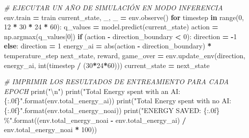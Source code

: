\documentclass[
]{book}
\newenvironment{Shaded}{\begin{snugshade}}{\end{snugshade}}
\newcommand{\BuiltInTok}[1]{#1}
\newcommand{\CharTok}[1]{\textcolor[rgb]{0.31,0.60,0.02}{#1}}
\newcommand{\CommentTok}[1]{\textcolor[rgb]{0.56,0.35,0.01}{\textit{#1}}}
\newcommand{\ControlFlowTok}[1]{\textcolor[rgb]{0.13,0.29,0.53}{\textbf{#1}}}
\newcommand{\DecValTok}[1]{\textcolor[rgb]{0.00,0.00,0.81}{#1}}
\newcommand{\KeywordTok}[1]{\textcolor[rgb]{0.13,0.29,0.53}{\textbf{#1}}}
\newcommand{\NormalTok}[1]{#1}
\newcommand{\OperatorTok}[1]{\textcolor[rgb]{0.81,0.36,0.00}{\textbf{#1}}}
\newcommand{\SpecialCharTok}[1]{\textcolor[rgb]{0.00,0.00,0.00}{#1}}
\newcommand{\StringTok}[1]{\textcolor[rgb]{0.31,0.60,0.02}{#1}}
\begin{document}
\begin{Shaded}
\begin{Highlighting}[]
\CommentTok{\# EJECUTAR UN AÑO DE SIMULACIÓN EN MODO INFERENCIA}
\NormalTok{env.train }\OperatorTok{=}\NormalTok{ train}
\NormalTok{current\_state, \_, \_ }\OperatorTok{=}\NormalTok{ env.observe()}
\ControlFlowTok{for}\NormalTok{ timestep }\KeywordTok{in} \BuiltInTok{range}\NormalTok{(}\DecValTok{0}\NormalTok{, }\DecValTok{12} \OperatorTok{*} \DecValTok{30} \OperatorTok{*} \DecValTok{24} \OperatorTok{*} \DecValTok{60}\NormalTok{):}
\NormalTok{    q\_values }\OperatorTok{=}\NormalTok{ model.predict(current\_state)}
\NormalTok{    action }\OperatorTok{=}\NormalTok{ np.argmax(q\_values[}\DecValTok{0}\NormalTok{])}
    \ControlFlowTok{if}\NormalTok{ (action }\OperatorTok{{-}}\NormalTok{ direction\_boundary }\OperatorTok{\textless{}} \DecValTok{0}\NormalTok{):}
\NormalTok{        direction }\OperatorTok{=} \OperatorTok{{-}}\DecValTok{1}
    \ControlFlowTok{else}\NormalTok{:}
\NormalTok{        direction }\OperatorTok{=} \DecValTok{1}
\NormalTok{    energy\_ai }\OperatorTok{=} \BuiltInTok{abs}\NormalTok{(action }\OperatorTok{{-}}\NormalTok{ direction\_boundary) }\OperatorTok{*}\NormalTok{ temperature\_step}
\NormalTok{    next\_state, reward, game\_over }\OperatorTok{=}\NormalTok{ env.update\_env(direction,}
\NormalTok{                                                   energy\_ai,}
                                                   \BuiltInTok{int}\NormalTok{(timestep }\OperatorTok{/}\NormalTok{ (}\DecValTok{30}\OperatorTok{*}\DecValTok{24}\OperatorTok{*}\DecValTok{60}\NormalTok{)))}
\NormalTok{    current\_state }\OperatorTok{=}\NormalTok{ next\_state}

\CommentTok{\# IMPRIMIR LOS RESULTADOS DE ENTREAMIENTO PARA CADA EPOCH}
\BuiltInTok{print}\NormalTok{(}\StringTok{"}\CharTok{\textbackslash{}n}\StringTok{"}\NormalTok{)}
\BuiltInTok{print}\NormalTok{(}\StringTok{"Total Energy spent with an AI: }\SpecialCharTok{\{:.0f\}}\StringTok{"}\NormalTok{.}\BuiltInTok{format}\NormalTok{(env.total\_energy\_ai))}
\BuiltInTok{print}\NormalTok{(}\StringTok{"Total Energy spent with no AI: }\SpecialCharTok{\{:.0f\}}\StringTok{"}\NormalTok{.}\BuiltInTok{format}\NormalTok{(env.total\_energy\_noai))}
\BuiltInTok{print}\NormalTok{(}\StringTok{"ENERGY SAVED: }\SpecialCharTok{\{:.0f\}}\StringTok{ \%"}\NormalTok{.}\BuiltInTok{format}\NormalTok{((env.total\_energy\_noai }\OperatorTok{{-}}\NormalTok{ env.total\_energy\_ai)}
                                     \OperatorTok{/}\NormalTok{ env.total\_energy\_noai }\OperatorTok{*} \DecValTok{100}\NormalTok{))}
\end{Highlighting}
\end{Shaded}
\end{document}
